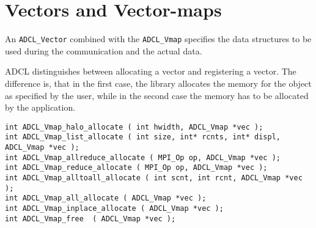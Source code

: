\section{Vectors and Vector-maps}

An {\tt ADCL\_Vector} combined with the {\tt ADCL\_Vmap} specifies the data
structures  to be used during the communication and the actual data. 


ADCL distinguishes between allocating a
vector and registering a vector. The difference is, that in the first case,
the library allocates the memory for the object as specified by the user,
while in the second case the memory has to be allocated by the application.


\begin{verbatim}
int ADCL_Vmap_halo_allocate ( int hwidth, ADCL_Vmap *vec );
int ADCL_Vmap_list_allocate ( int size, int* rcnts, int* displ, ADCL_Vmap *vec );
int ADCL_Vmap_allreduce_allocate ( MPI_Op op, ADCL_Vmap *vec );
int ADCL_Vmap_reduce_allocate ( MPI_Op op, ADCL_Vmap *vec );
int ADCL_Vmap_alltoall_allocate ( int scnt, int rcnt, ADCL_Vmap *vec );
int ADCL_Vmap_all_allocate ( ADCL_Vmap *vec );
int ADCL_Vmap_inplace_allocate ( ADCL_Vmap *vec );
int ADCL_Vmap_free  ( ADCL_Vmap *vec );
\end{verbatim}

